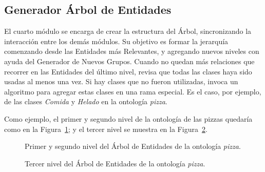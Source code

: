 

\subsection{Generador Árbol de Entidades}
El cuarto módulo se encarga de crear la estructura del Árbol, sincronizando la interacción entre los demás módulos. Su objetivo es formar la jerarquía comenzando desde las Entidades más Relevantes, y agregando nuevos niveles con ayuda del Generador de Nuevos Grupos. Cuando no quedan más relaciones que recorrer en las Entidades del último nivel, revisa que todas las clases haya sido usadas al menos una vez. Si hay clases que no fueron utilizadas, invoca un algoritmo para agregar estas clases en una rama especial. Es el caso, por ejemplo, de las clases \emph{Comida} y \emph{Helado} en la ontología \emph{pizza}.

Como ejemplo, el primer y segundo nivel de la ontología de las pizzas quedaría como en la Figura~\ref{fig:macro_planning_pizza}; y el tercer nivel se muestra en la Figura~\ref{fig:macro_planning_pizza_n2}.

\begin{figure}
\centering
\begin{minipage}[c]{0.7\textwidth}
{\footnotesize 
{}}
\caption{Primer y segundo nivel del Árbol de Entidades de la ontología \emph{pizza}.}
\label{fig:macro_planning_pizza}
\end{minipage}
\end{figure}

\begin{figure}
\centering
\begin{minipage}[c]{0.7\textwidth}
{\footnotesize 
{}}
\caption{Tercer nivel del Árbol de Entidades de la ontología \emph{pizza}.}
\label{fig:macro_planning_pizza_n2}
\end{minipage}
\end{figure}


